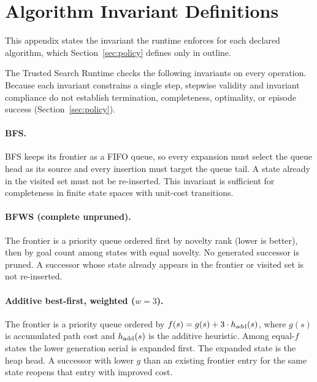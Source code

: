 \section{Algorithm Invariant Definitions}
\label{app:invariants}

This appendix states the invariant the runtime enforces for each declared algorithm, which Section~\ref{sec:policy} defines only in outline.

The Trusted Search Runtime checks the following invariants on every operation. Because each invariant constrains a single step, stepwise validity and invariant compliance do not establish termination, completeness, optimality, or episode success (Section~\ref{sec:policy}).

\paragraph{BFS.}
BFS keeps its frontier as a FIFO queue, so every expansion must select the queue head as its source and every insertion must target the queue tail. A state already in the visited set must not be re-inserted. This invariant is sufficient for completeness in finite state spaces with unit-cost transitions.

\paragraph{BFWS (complete unpruned).}
The frontier is a priority queue ordered first by novelty rank (lower is better), then by goal count among states with equal novelty. No generated successor is pruned. A successor whose state already appears in the frontier or visited set is not re-inserted.

\paragraph{Additive best-first, weighted ($w = 3$).}
The frontier is a priority queue ordered by $f(s) = g(s) + 3 \cdot h_{\rm add}(s)$, where $g(s)$ is accumulated path cost and $h_{\rm add}(s)$ is the additive heuristic. Among equal-$f$ states the lower generation serial is expanded first. The expanded state is the heap head. A successor with lower $g$ than an existing frontier entry for the same state reopens that entry with improved cost.


